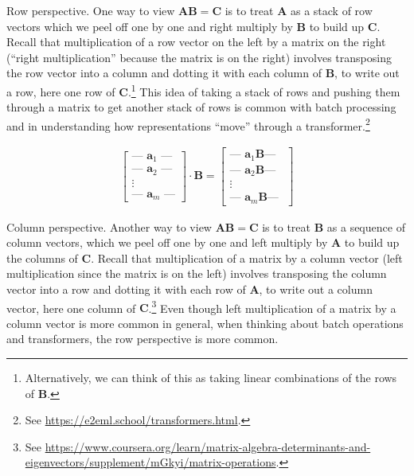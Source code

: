 Row perspective. One way to view $\mathbf{A}\mathbf{B} = \mathbf{C}$ is to treat $\mathbf{A}$ as a stack of row vectors which we peel off one by one and right multiply by $\mathbf{B}$ to build up $\mathbf{C}$.  Recall that multiplication of a row vector on the left by a matrix on the right (``right multiplication'' because the matrix is on the right)  involves transposing the row vector into a column and dotting it with each column of  $\mathbf{B}$, to write out a row, here one row of $\mathbf{C}$.\footnote{Alternatively, we can think of this as taking linear combinations of the rows of $\mathbf{B}$.} This idea of taking a stack of rows and pushing them through a matrix to get another stack of rows is common with batch processing and in understanding how representations ``move'' through a transformer.\footnote{See \url{ https://e2eml.school/transformers.html}.} 

\begin{align*}
\begin{bmatrix}
\text{--- } \mathbf{a}_1 \text{ ---} \\
\text{--- } \mathbf{a}_2 \text{ ---} \\
\vdots \\
\text{--- } \mathbf{a}_m \text{ ---}
\end{bmatrix}
\cdot
\mathbf{B}
=
\begin{bmatrix}
\text{--- } \mathbf{a}_1 \mathbf{B} \text{--- } \\
\text{--- } \mathbf{a}_2 \mathbf{B} \text{--- } \\
\vdots \\
\text{--- } \mathbf{a}_m \mathbf{B} \text{--- }
\end{bmatrix}
\end{align*}

Column perspective. Another way to view $\mathbf{A}\mathbf{B} = \mathbf{C}$ is to treat $\mathbf{B}$ as a sequence of column vectors, which we peel off one by one and left multiply by $\mathbf{A}$ to build up the columns of $\mathbf{C}$. Recall that multiplication of a matrix by a column vector (left multiplication since the matrix is on the left) involves transposing the column vector into a row and dotting it with each row of  $\mathbf{A}$, to write out a column vector, here one column of $\mathbf{C}$.\footnote{See \url{https://www.coursera.org/learn/matrix-algebra-determinants-and-eigenvectors/supplement/mGkyi/matrix-operations}.} Even though left multiplication of a matrix by a column vector is more common in general, when thinking about batch operations and transformers, the row perspective is more common.

